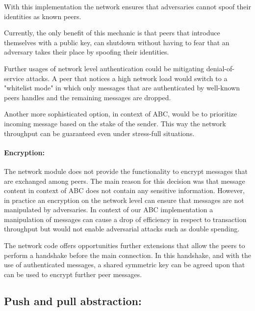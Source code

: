 With this implementation the network ensures that adversaries cannot spoof their identities as known peers.

Currently, the only benefit of this mechanic is that peers that introduce themselves with a public key, can shutdown without having to fear that an adversary takes their place by spoofing their identities.

Further usages of network level authentication could be mitigating denial-of-service attacks. A peer that notices a high network load would switch to a "whitelist mode" in which only messages that are authenticated by well-known peers handles and the remaining messages are dropped. 

Another more sophisticated option, in context of ABC, would be to prioritize incoming message based on the stake of the sender. This way the network throughput can be guaranteed even under stress-full situations.

\paragraph{Encryption:}
The network module does not provide the functionality to encrypt messages that are exchanged among peers.
The main reason for this decision was that message content in context of ABC does not contain any sensitive information. 
However, in practice an encryption on the network level can ensure that messages are not manipulated by adversaries. In context of our ABC implementation a manipulation of messages can cause a drop of efficiency in respect to transaction throughput but would not enable adversarial attacks such as double spending.

The network code offers opportunities further extensions that allow the peers to perform a handshake before the main connection. In this handshake, and with the use of authenticated messages, a shared symmetric key can be agreed upon that can be used to encrypt further peer messages.

\subsection{Push and pull abstraction:}

